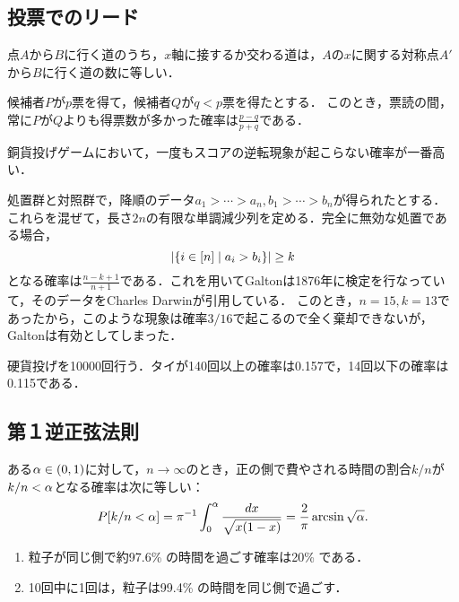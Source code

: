\documentclass[uplatex,dvipdfmx]{jsreport}
\begin{document}
\subsection{投票でのリード}

\begin{lemma}[鏡像原理]
    点$A$から$B$に行く道のうち，$x$軸に接するか交わる道は，$A$の$x$に関する対称点$A'$から$B$に行く道の数に等しい．
\end{lemma}

\begin{corollary}
    候補者$P$が$p$票を得て，候補者$Q$が$q<p$票を得たとする．
    このとき，票読の間，常に$P$が$Q$よりも得票数が多かった確率は$\frac{p-q}{p+q}$である．
\end{corollary}

\begin{corollary}
    銅貨投げゲームにおいて，一度もスコアの逆転現象が起こらない確率が一番高い．
\end{corollary}

\begin{example}[リードの逆転は思ったよりも起こらない]
    処置群と対照群で，降順のデータ$a_1>\cdots>a_n,b_1>\cdots>b_n$が得られたとする．
    これらを混ぜて，長さ$2n$の有限な単調減少列を定める．完全に無効な処置である場合，
    \[\left|\left\{i\in[n]\mid a_i>b_i\right\}\right|\ge k\]
    となる確率は$\frac{n-k+1}{n+1}$である．これを用いてGaltonは1876年に検定を行なっていて，そのデータをCharles Darwinが引用している．
    このとき，$n=15,k=13$であったから，このような現象は確率$3/16$で起こるので全く棄却できないが，Galtonは有効としてしまった．
\end{example}

\begin{example}[タイも驚くほど起こらない]
    硬貨投げを10000回行う．タイが140回以上の確率は0.157で，14回以下の確率は0.115である．
\end{example}

\subsection{第１逆正弦法則}

\begin{theorem}[第１逆正弦法則]
    ある$\alpha\in(0,1)$に対して，$n\to\infty$のとき，正の側で費やされる時間の割合$k/n$が$k/n<\alpha$となる確率は次に等しい：
    \[P[k/n<\alpha]=\pi^{-1}\int^\alpha_0\frac{dx}{\sqrt{x(1-x)}}=\frac{2}{\pi}\arcsin\sqrt{\alpha}.\]
\end{theorem}
\begin{corollary}\mbox{}
    \begin{enumerate}
        \item 粒子が同じ側で約97.6\% の時間を過ごす確率は20\% である．
        \item 10回中に1回は，粒子は99.4\% の時間を同じ側で過ごす．
    \end{enumerate}
\end{corollary}
\end{document}
